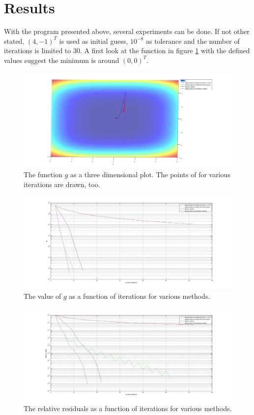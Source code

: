 \documentclass[a4paper,11pt]{article}
\begin{document}
\section{Results}
With the program presented above, several experiments can be done.
If not other stated, $(4,-1)^T$ is used as initial guess, $10^{-8}$ as tolerance and the number of iterations is limited to $30$.
A first look at the function in figure \ref{g} with the defined values suggest the minimum is around $(0,0)^T$.
\begin{figure}[h]\label{g}
	\includegraphics[width=\textwidth]{g.jpg}
	\caption{The function $g$ as a three dimensional plot. The points of for various iterations are drawn, too.}
\end{figure}
\begin{figure}\label{gvalue}
	\includegraphics[width=\textwidth]{gvalues.jpg}
	\caption{The value of $g$ as a function of iterations for various methods.}
\end{figure}
\begin{figure}\label{res}
	\includegraphics[width=\textwidth]{res.jpg}
	\caption{The relative residuals as a function of iterations for various methods.}
\end{figure}
\end{document}
